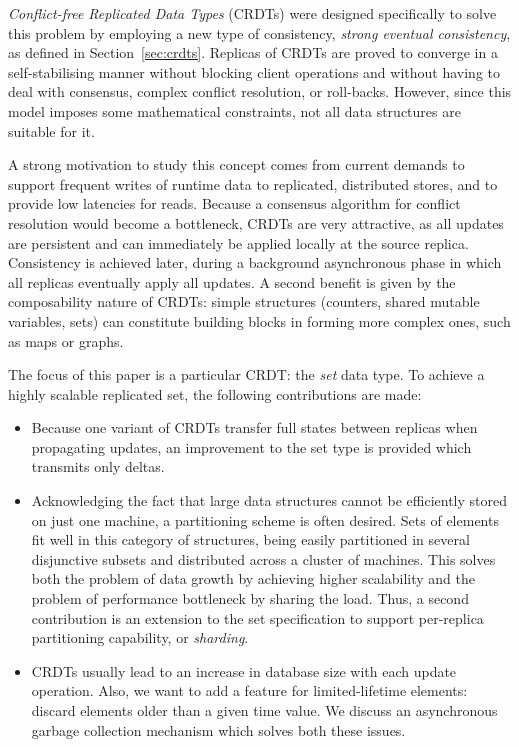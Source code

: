 \textit{Conflict-free Replicated Data Types} (CRDTs) were designed specifically
to solve this problem by employing a new type of consistency, \textit{strong
eventual consistency}, as defined in Section~\ref{sec:crdts}. Replicas of CRDTs
are proved to converge in a self-stabilising manner without blocking client
operations and without having to deal with consensus, complex conflict
resolution, or roll-backs. However, since this model imposes some mathematical
constraints, not all data structures are suitable for it.

A strong motivation to study this concept comes from current demands to support
frequent writes of runtime data to replicated, distributed stores, and to
provide low latencies for reads. Because a consensus algorithm for conflict
resolution would become a bottleneck, CRDTs are very attractive, as all updates
are persistent and can immediately be applied locally at the source replica.
Consistency is achieved later, during a background asynchronous phase in which
all replicas eventually apply all updates. A second benefit is given by the
composability nature of CRDTs: simple structures (counters, shared mutable
variables, sets) can constitute building blocks in forming more complex ones,
such as maps or graphs.

The focus of this paper is a particular CRDT: the \textit{set} data type. To
achieve a highly scalable replicated set, the following contributions are made:
\begin{itemize}
  \item Because one variant of CRDTs transfer full states between replicas when
  propagating updates, an improvement to the set type is provided which
  transmits only deltas.
  \item Acknowledging the fact that large data structures cannot be efficiently
  stored on just one machine, a partitioning scheme is often desired. Sets of
  elements fit well in this category of structures, being easily partitioned in
  several disjunctive subsets and distributed across a cluster of machines.
  This solves both the problem of data growth by achieving higher scalability
  and the problem of performance bottleneck by sharing the load. Thus, a second
  contribution is an extension to the set specification to support per-replica
  partitioning capability, or \textit{sharding}.
  \item CRDTs usually lead to an increase in database size with each update
  operation. Also, we want to add a feature for limited-lifetime elements:
  discard elements older than a given time value. We discuss an asynchronous
  garbage collection mechanism which solves both these issues.
\end{itemize}